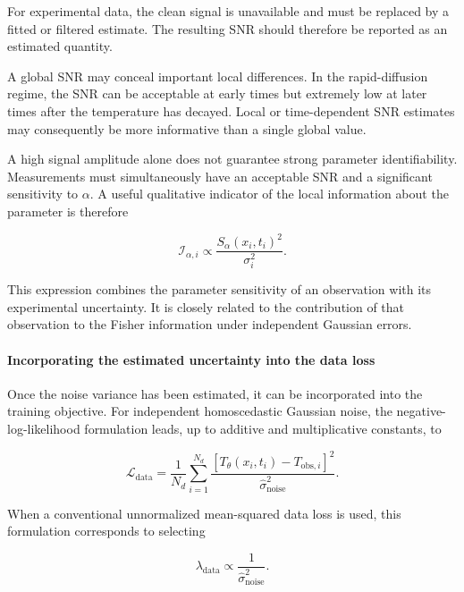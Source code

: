 For experimental data, the clean signal is unavailable and must be replaced by
a fitted or filtered estimate. The resulting SNR should therefore be reported
as an estimated quantity.

A global SNR may conceal important local differences. In the rapid-diffusion
regime, the SNR can be acceptable at early times but extremely low at later
times after the temperature has decayed. Local or time-dependent SNR estimates
may consequently be more informative than a single global value.

A high signal amplitude alone does not guarantee strong parameter
identifiability. Measurements must simultaneously have an acceptable SNR and a
significant sensitivity to $\alpha$. A useful qualitative indicator of the
local information about the parameter is therefore

\begin{equation}
\mathcal{I}_{\alpha,i}
\propto
\frac{
S_{\alpha}(x_i,t_i)^2
}{
\sigma_i^2
}.
\end{equation}

This expression combines the parameter sensitivity of an observation with its
experimental uncertainty. It is closely related to the contribution of that
observation to the Fisher information under independent Gaussian errors.

\paragraph{Incorporating the estimated uncertainty into the data loss}

Once the noise variance has been estimated, it can be incorporated into the
training objective. For independent homoscedastic Gaussian noise, the
negative-log-likelihood formulation leads, up to additive and multiplicative
constants, to

\begin{equation}
\mathcal{L}_{\mathrm{data}}
=
\frac{1}{N_d}
\sum_{i=1}^{N_d}
\frac{
\left[
T_{\theta}(x_i,t_i)
-
T_{\mathrm{obs},i}
\right]^2
}{
\widehat{\sigma}_{\mathrm{noise}}^2
}.
\end{equation}

When a conventional unnormalized mean-squared data loss is used, this
formulation corresponds to selecting

\begin{equation}
\lambda_{\mathrm{data}}
\propto
\frac{1}{
\widehat{\sigma}_{\mathrm{noise}}^2
}.
\end{equation}

